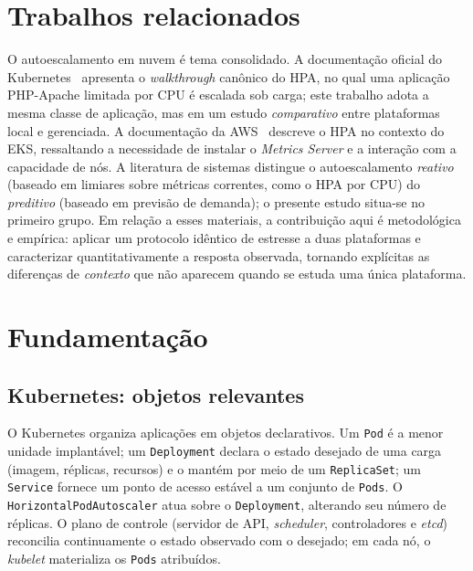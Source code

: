 \documentclass[conference]{IEEEtran}
\begin{document}
\section{Trabalhos relacionados}\label{sec:rel}
O autoescalamento em nuvem é tema consolidado. A documentação oficial do Kubernetes~\cite{k8shpa}
apresenta o \textit{walkthrough} canônico do HPA, no qual uma aplicação PHP-Apache limitada por
CPU é escalada sob carga; este trabalho adota a mesma classe de aplicação, mas em um estudo
\emph{comparativo} entre plataformas local e gerenciada. A documentação da AWS~\cite{ekshpa}
descreve o HPA no contexto do EKS, ressaltando a necessidade de instalar o \textit{Metrics Server}
e a interação com a capacidade de nós. A literatura de sistemas distingue o autoescalamento
\emph{reativo} (baseado em limiares sobre métricas correntes, como o HPA por CPU) do
\emph{preditivo} (baseado em previsão de demanda); o presente estudo situa-se no primeiro grupo.
Em relação a esses materiais, a contribuição aqui é metodológica e empírica: aplicar um protocolo
idêntico de estresse a duas plataformas e caracterizar quantitativamente a resposta observada,
tornando explícitas as diferenças de \emph{contexto} que não aparecem quando se estuda uma única
plataforma.

\section{Fundamentação}\label{sec:fund}
\subsection{Kubernetes: objetos relevantes}
O Kubernetes organiza aplicações em objetos declarativos. Um \texttt{Pod} é a menor unidade
implantável; um \texttt{Deployment} declara o estado desejado de uma carga (imagem, réplicas,
recursos) e o mantém por meio de um \texttt{ReplicaSet}; um \texttt{Service} fornece um ponto de
acesso estável a um conjunto de \texttt{Pods}. O \texttt{HorizontalPodAutoscaler} atua sobre o
\texttt{Deployment}, alterando seu número de réplicas. O plano de controle (servidor de API,
\textit{scheduler}, controladores e \textit{etcd}) reconcilia continuamente o estado observado
com o desejado; em cada nó, o \textit{kubelet} materializa os \texttt{Pods} atribuídos.
\end{document}

